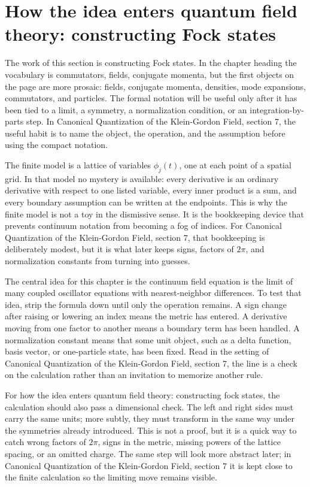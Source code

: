\section{How the idea enters quantum field theory: constructing Fock states}

The work of this section is constructing Fock states.  In the chapter heading the vocabulary is commutators, fields, conjugate momenta, but the first objects on the page are more prosaic: fields, conjugate momenta, densities, mode expansions, commutators, and particles.  The formal notation will be useful only after it has been tied to a limit, a symmetry, a normalization condition, or an integration-by-parts step.  In Canonical Quantization of the Klein-Gordon Field, section 7, the useful habit is to name the object, the operation, and the assumption before using the compact notation.

The finite model is a lattice of variables \(\phi_j(t)\), one at each point of a spatial grid.  In that model no mystery is available: every derivative is an ordinary derivative with respect to one listed variable, every inner product is a sum, and every boundary assumption can be written at the endpoints.  This is why the finite model is not a toy in the dismissive sense.  It is the bookkeeping device that prevents continuum notation from becoming a fog of indices.  For Canonical Quantization of the Klein-Gordon Field, section 7, that bookkeeping is deliberately modest, but it is what later keeps signs, factors of \(2\pi\), and normalization constants from turning into guesses.

The central idea for this chapter is the continuum field equation is the limit of many coupled oscillator equations with nearest-neighbor differences.  To test that idea, strip the formula down until only the operation remains.  A sign change after raising or lowering an index means the metric has entered.  A derivative moving from one factor to another means a boundary term has been handled.  A normalization constant means that some unit object, such as a delta function, basis vector, or one-particle state, has been fixed.  Read in the setting of Canonical Quantization of the Klein-Gordon Field, section 7, the line is a check on the calculation rather than an invitation to memorize another rule.

For how the idea enters quantum field theory: constructing fock states, the calculation should also pass a dimensional check.  The left and right sides must carry the same units; more subtly, they must transform in the same way under the symmetries already introduced.  This is not a proof, but it is a quick way to catch wrong factors of \(2\pi\), signs in the metric, missing powers of the lattice spacing, or an omitted charge.  The same step will look more abstract later; in Canonical Quantization of the Klein-Gordon Field, section 7 it is kept close to the finite calculation so the limiting move remains visible.


